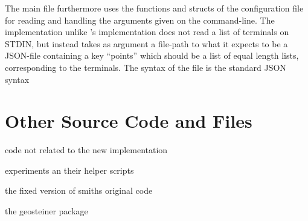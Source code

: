 The main file furthermore uses the functions and structs of the configuration
file for reading and handling the arguments given on the command-line. The
implementation unlike \citeauthor{smith1992}'s implementation does not read a
list of terminals on STDIN, but instead takes as argument a file-path to what it
expects to be a JSON-file containing a key ``points'' which should be a list of
equal length lists, corresponding to the terminals. The syntax of the file is
the standard JSON syntax

\section{Other Source Code and Files}
\label{sec:other-source-code}

code not related to the new implementation

experiments an their helper scripts

the fixed version of smiths original code

the geosteiner package

